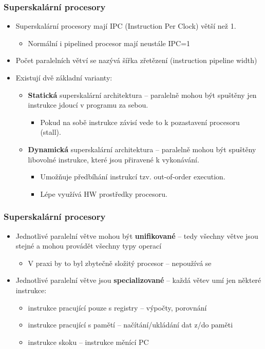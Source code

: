 \documentclass{beamer}
\begin{document}
\begin{frame}
\frametitle{Superskalární procesory}

\begin{itemize}
\item Superskalární procesory mají IPC (Instruction Per Clock) větší než 1. 
  \begin{itemize}
  \item Normální i pipelined procesor mají neustále IPC=1
  \end{itemize}
\item Počet paralelních větví se nazývá šířka zřetězení (instruction pipeline width)
\item Existují dvě základní varianty:
  \begin{itemize}
  \item \textbf{Statická} superskalární architektura -- paralelně mohou být spuštěny jen instrukce jdoucí v programu za sebou.
    \begin{itemize}
    \item Pokud na sobě instrukce závisí vede to k pozastavení procesoru (stall).
    \end{itemize}
  \item \textbf{Dynamická} superskalární architektura -- paralelně mohou být spuštěny libovolné instrukce, které jsou přiravené k vykonávání. 
    \begin{itemize}
    \item Umožňuje předbíhání instrukcí tzv. out-of-order execution.
    \item Lépe využívá HW prostředky procesoru.
    \end{itemize}
  \end{itemize}
\end{itemize}

\end{frame}

\begin{frame}
\frametitle{Superskalární procesory}

\begin{itemize}
\item Jednotlivé paralelní větve mohou být \textbf{unifikované} -- tedy všechny větve jsou stejné a mohou provádět všechny typy operací
  \begin{itemize}
  \item V praxi by to byl zbytečně složitý procesor -- nepoužívá se
  \end{itemize}
\item Jednotlivé paralelní větve jsou \textbf{specializované} -- každá větev umí jen některé instrukce:
  \begin{itemize}
  \item instrukce pracující pouze s registry -- výpočty, porovnání
  \item instrukce pracující s pamětí -- načítání/ukládání dat z/do paměti
  \item instrukce skoku -- instrukce měnící PC
  \end{itemize}
\end{itemize}
\end{frame}
\end{document}
